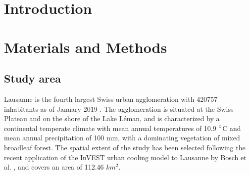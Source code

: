 \documentclass[12pt]{iopart}
\begin{document}


\author{Mart\'i Bosch$^1$}

\address{$^1$ Urban and Regional Planning Community (CEAT), \'Ecole Polytechnique F\'ed\'erale de Lausanne (EPFL), Lausanne, Switzerland}

\begin{abstract}

\end{abstract}

%
%
%
% 
%



\section{Introduction}



\section{Materials and Methods}

\subsection{Study area}

Lausanne is the fourth largest Swiss urban agglomeration with 420757 inhabitants as of January 2019 \cite{sfso2018city}. The agglomeration is situated at the Swiss Plateau and on the shore of the Lake L\'eman, and is characterized by a continental temperate climate with mean annual temperatures of 10.9 $\degree$C and mean annual precipitation of 100 mm, with a dominating vegetation of mixed broadleaf forest. The spatial extent of the study has been selected following the recent application of the InVEST urban cooling model to Lausanne by Bosch et al. \cite{bosch2020spatially}, and covers an area of 112.46 $km^2$.
\end{document}
